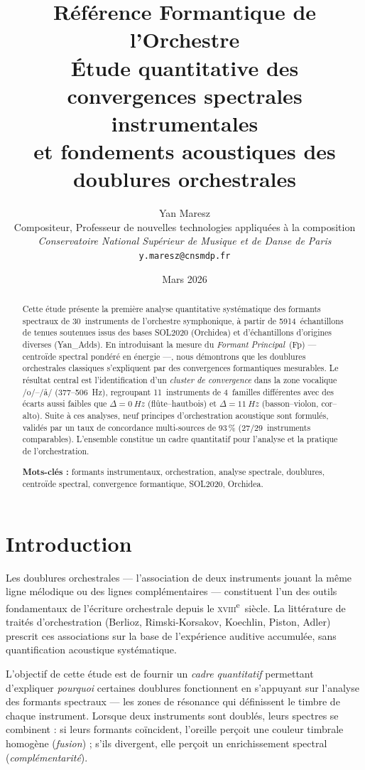 \documentclass[11pt,a4paper]{article}
\title{%
  \textbf{Référence Formantique de l'Orchestre}\\[6pt]
  \large Étude quantitative des convergences spectrales instrumentales\\
  et fondements acoustiques des doublures orchestrales%
}
\author{%
  Yan Maresz\\
  Compositeur, Professeur de nouvelles technologies appliquées à la composition\\
  \textit{Conservatoire National Supérieur de Musique et de Danse de Paris}\\
  \texttt{y.maresz@cnsmdp.fr}%
}
\date{Mars 2026}
\begin{document}
\maketitle

\begin{abstract}
Cette étude présente la première analyse quantitative systématique des
formants spectraux de 30~instruments de l'orchestre symphonique, à partir
de \num{5914}~échantillons de tenues soutenues issus des bases SOL2020
(Orchidea) et d'échantillons d'origines diverses (Yan\_Adds). En introduisant la mesure du \emph{Formant
Principal}~(Fp) --- centroïde spectral pondéré en énergie ---, nous
démontrons que les doublures orchestrales classiques s'expliquent par des
convergences formantiques mesurables. Le résultat central est
l'identification d'un \emph{cluster de convergence} dans la zone
vocalique /o/--/\r{a}/ (377--506~Hz), regroupant 11~instruments de
4~familles différentes avec des écarts aussi faibles que $\Delta =
\SI{0}{Hz}$ (flûte--hautbois) et $\Delta = \SI{11}{Hz}$
(basson--violon, cor--alto). Suite à ces analyses, neuf principes d'orchestration acoustique
sont formulés, validés par un taux de concordance multi-sources de
93\,\% (27/29~instruments comparables). L'ensemble constitue un cadre
quantitatif pour l'analyse et la pratique de l'orchestration.

\medskip
\noindent\textbf{Mots-clés :} formants instrumentaux, orchestration,
analyse spectrale, doublures, centroïde spectral, convergence
formantique, SOL2020, Orchidea.
\end{abstract}


\section{Introduction}

Les doublures orchestrales --- l'association de deux instruments jouant
la même ligne mélodique ou des lignes complémentaires --- constituent
l'un des outils fondamentaux de l'écriture orchestrale depuis le
\textsc{xviii}\textsuperscript{e}~siècle. La littérature de traités
d'orchestration (Berlioz, Rimski-Korsakov, Koechlin, Piston, Adler)
prescrit ces associations sur la base de l'expérience auditive
accumulée, sans quantification acoustique systématique.

L'objectif de cette étude est de fournir un \emph{cadre quantitatif}
permettant d'expliquer \emph{pourquoi} certaines doublures fonctionnent
en s'appuyant sur l'analyse des formants spectraux --- les zones de
résonance qui définissent le timbre de chaque instrument. Lorsque deux
instruments sont doublés, leurs spectres se combinent : si leurs
formants coïncident, l'oreille perçoit une couleur timbrale homogène
(\emph{fusion}) ; s'ils divergent, elle perçoit un enrichissement
spectral (\emph{complémentarité}).
\end{document}
